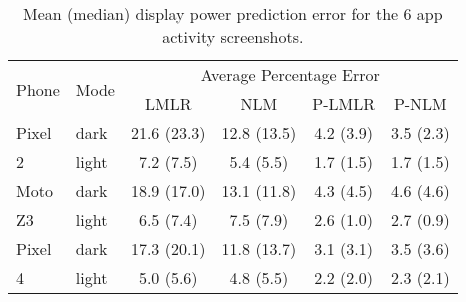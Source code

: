 \begin{table}[tp]
\begin{center}
\centering
\caption{Mean (median) display power prediction error for the 6 app activity screenshots.}
\vspace{-0.1in}
{ \footnotesize
    \begin{tabular}{|p{7mm}|p{6mm}|c|c|c|c|}
    	\hline
    	       \multirow{2}{*}{Phone} & \multirow{2}{*}{Mode} & \multicolumn{4}{c|}{Average Percentage Error} \\
    	\cline{3-6}
    	        &   & LMLR & NLM & P-LMLR & P-NLM\\
    	\hline
    	Pixel & dark   & 21.6 (23.3) & 12.8 (13.5) & 4.2 (3.9) & 3.5 (2.3) \\ %
    	    2 & light  & 7.2 (7.5) & 5.4 (5.5) & 1.7 (1.5) & 1.7 (1.5) \\
    	\hline
    	Moto  & dark   & 18.9 (17.0) & 13.1 (11.8) & 4.3 (4.5) & 4.6 (4.6) \\ %
           Z3 & light  & 6.5 (7.4) & 7.5 (7.9) & 2.6 (1.0) & 2.7 (0.9) \\
    	\hline
        Pixel & dark   & 17.3 (20.1) & 11.8 (13.7) & 3.1 (3.1) & 3.5 (3.6) \\ %
            4 & light  & 5.0 (5.6) & 4.8 (5.5) & 2.2 (2.0) & 2.3 (2.1) \\
    	\hline
    \end{tabular}
}
\label{tab:100_images}
\end{center}
\vspace{-0.2in}
\end{table}

